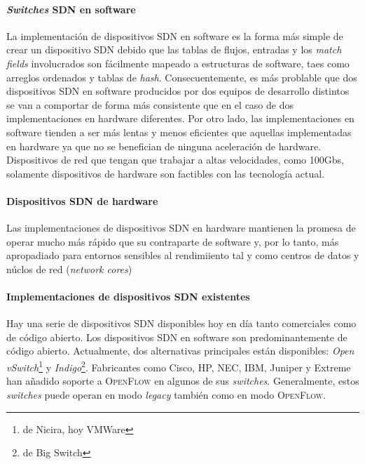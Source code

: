\documentclass[10pt,journal,compsoc]{IEEEtran}
\begin{document}
\paragraph{\emph{Switches} SDN en software}
La implementación de dispositivos SDN en software es la forma más simple de crear un dispositivo SDN debido que las tablas de flujos, entradas y los \emph{match fields} involucrados son fácilmente mapeado a estructuras de software, taes como arreglos ordenados y tablas de \emph{hash}. Consecuentemente, es más problable que dos dispositivos SDN en software producidos por dos equipos de desarrollo distintos se van a comportar de forma más consistente que en el caso de dos implementaciones en hardware diferentes. Por otro lado, las implementaciones en software tienden a ser más lentas y menos eficientes que aquellas implementadas en hardware ya que no se benefician de ninguna aceleración de hardware. Dispositivos de red que tengan que trabajar a altas velocidades, como 100Gbs, solamente dispositivos de hardware son factibles con las tecnología actual.

\paragraph{Dispositivos SDN de hardware}
Las implementaciones de dispositivos SDN en hardware mantienen la promesa de operar mucho más rápido que su contraparte de software y, por lo tanto, más apropadiado para entornos sensibles al rendimiiento tal y como centros de datos y núclos de red (\emph{network cores})

\paragraph{Implementaciones de dispositivos SDN existentes}
Hay una serie de dispositivos SDN disponibles hoy en día tanto comerciales como de código abierto. Los dispositivos SDN en software son predominantemente de código abierto. Actualmente, dos alternativas principales están disponibles: \emph{Open vSwitch}\footnote{de Nicira, hoy VMWare } y \emph{Indigo}\footnote{de Big Switch}. Fabricantes como Cisco, HP, NEC, IBM, Juniper y Extreme han añadido soporte a \textsc{OpenFlow} en algunos de sus \emph{switches}. Generalmente, estos \emph{switches} puede operan en modo \emph{legacy} también como en modo \textsc{OpenFlow}.
\end{document}
